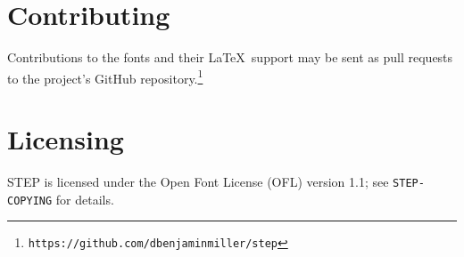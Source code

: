\documentclass[12pt]{article}
\begin{document}
\section{Contributing}
Contributions to the fonts and their \LaTeX\ support may be sent as pull requests to the project's GitHub repository.\footnote{\texttt{https://github.com/dbenjaminmiller/step}}
\section{Licensing}
STEP is licensed under the Open Font License (OFL) version 1.1; see \texttt{STEP-COPYING} for details.
\end{document}
